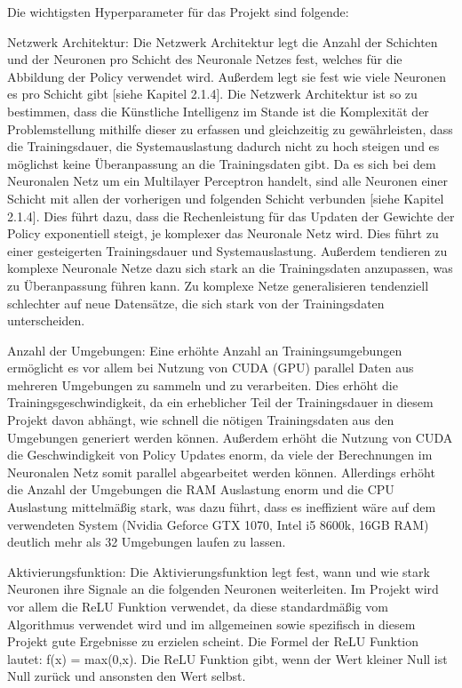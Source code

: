 Die wichtigsten Hyperparameter für das Projekt sind folgende:

Netzwerk Architektur: Die Netzwerk Architektur legt die Anzahl der Schichten und der Neuronen pro Schicht des Neuronale Netzes fest, welches für die Abbildung der Policy verwendet wird. Außerdem legt sie fest wie viele Neuronen es pro Schicht gibt [siehe Kapitel 2.1.4]. Die Netzwerk Architektur ist so zu bestimmen, dass die Künstliche Intelligenz im Stande ist die Komplexität der Problemstellung mithilfe dieser zu erfassen und gleichzeitig zu gewährleisten, dass die Trainingsdauer, die Systemauslastung dadurch nicht zu hoch steigen und es möglichst keine Überanpassung an die Trainingsdaten gibt. Da es sich bei dem Neuronalen Netz um ein Multilayer Perceptron handelt, sind alle Neuronen einer Schicht mit allen der vorherigen und folgenden Schicht verbunden [siehe Kapitel 2.1.4]. Dies führt dazu, dass die Rechenleistung für das Updaten der Gewichte der Policy exponentiell steigt, je komplexer das Neuronale Netz wird. Dies führt zu einer gesteigerten Trainingsdauer und Systemauslastung. Außerdem tendieren zu komplexe Neuronale Netze dazu sich stark an die Trainingsdaten anzupassen, was zu Überanpassung führen kann. Zu komplexe Netze generalisieren tendenziell schlechter auf neue Datensätze, die sich stark von der Trainingsdaten unterscheiden.

Anzahl der Umgebungen: Eine erhöhte Anzahl an Trainingsumgebungen ermöglicht es vor allem bei Nutzung von CUDA (GPU) parallel Daten aus mehreren Umgebungen zu sammeln und zu verarbeiten. Dies erhöht die Trainingsgeschwindigkeit, da ein erheblicher Teil der Trainingsdauer in diesem Projekt davon abhängt, wie schnell die nötigen Trainingsdaten aus den Umgebungen generiert werden können. Außerdem erhöht die Nutzung von CUDA die Geschwindigkeit von Policy Updates enorm, da viele der Berechnungen im Neuronalen Netz somit parallel abgearbeitet werden können. Allerdings erhöht die Anzahl der Umgebungen die RAM Auslastung enorm und die CPU Auslastung mittelmäßig stark, was dazu führt, dass es ineffizient wäre auf dem verwendeten System (Nvidia Geforce GTX 1070, Intel i5 8600k, 16GB RAM) deutlich mehr als 32 Umgebungen laufen zu lassen.

Aktivierungsfunktion: Die Aktivierungsfunktion legt fest, wann und wie stark Neuronen ihre Signale an die folgenden Neuronen weiterleiten. Im Projekt wird vor allem die ReLU Funktion verwendet, da diese standardmäßig vom Algorithmus verwendet wird und im allgemeinen sowie spezifisch in diesem Projekt gute Ergebnisse zu erzielen scheint. Die Formel der ReLU Funktion lautet: f(x) = max(0,x). Die ReLU Funktion gibt, wenn der Wert kleiner Null ist Null zurück und ansonsten den Wert selbst.\\


